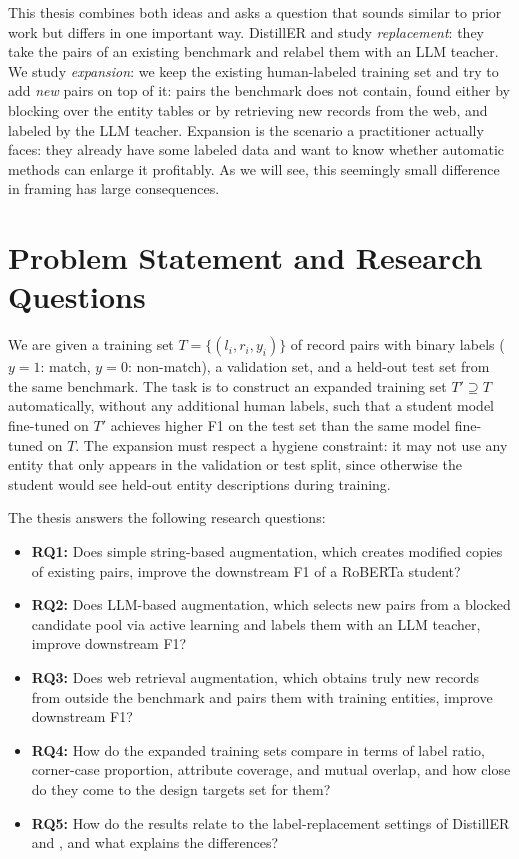 \documentclass[a4paper,oneside,bibliography=totoc]{scrbook}
\begin{document}
This thesis combines both ideas and asks a question that sounds similar to prior work but differs in one important way. DistillER and \citet{steiner2026labeling} study \emph{replacement}: they take the pairs of an existing benchmark and relabel them with an LLM teacher. We study \emph{expansion}: we keep the existing human-labeled training set and try to add \emph{new} pairs on top of it: pairs the benchmark does not contain, found either by blocking over the entity tables or by retrieving new records from the web, and labeled by the LLM teacher. Expansion is the scenario a practitioner actually faces: they already have some labeled data and want to know whether automatic methods can enlarge it profitably. As we will see, this seemingly small difference in framing has large consequences.

\section{Problem Statement and Research Questions}
\label{sec:problem}

We are given a training set $T = \{(l_i, r_i, y_i)\}$ of record pairs with binary labels ($y=1$: match, $y=0$: non-match), a validation set, and a held-out test set from the same benchmark. The task is to construct an expanded training set $T' \supseteq T$ automatically, without any additional human labels, such that a student model fine-tuned on $T'$ achieves higher F1 on the test set than the same model fine-tuned on $T$. The expansion must respect a hygiene constraint: it may not use any entity that only appears in the validation or test split, since otherwise the student would see held-out entity descriptions during training.

The thesis answers the following research questions:

\begin{itemize}
\item \textbf{RQ1:} Does simple string-based augmentation, which creates modified copies of existing pairs, improve the downstream F1 of a RoBERTa student?
\item \textbf{RQ2:} Does LLM-based augmentation, which selects new pairs from a blocked candidate pool via active learning and labels them with an LLM teacher, improve downstream F1?
\item \textbf{RQ3:} Does web retrieval augmentation, which obtains truly new records from outside the benchmark and pairs them with training entities, improve downstream F1?
\item \textbf{RQ4:} How do the expanded training sets compare in terms of label ratio, corner-case proportion, attribute coverage, and mutual overlap, and how close do they come to the design targets set for them?
\item \textbf{RQ5:} How do the results relate to the label-replacement settings of DistillER \cite{zeakis2026distiller} and \citet{steiner2026labeling}, and what explains the differences?
\end{itemize}
\end{document}

